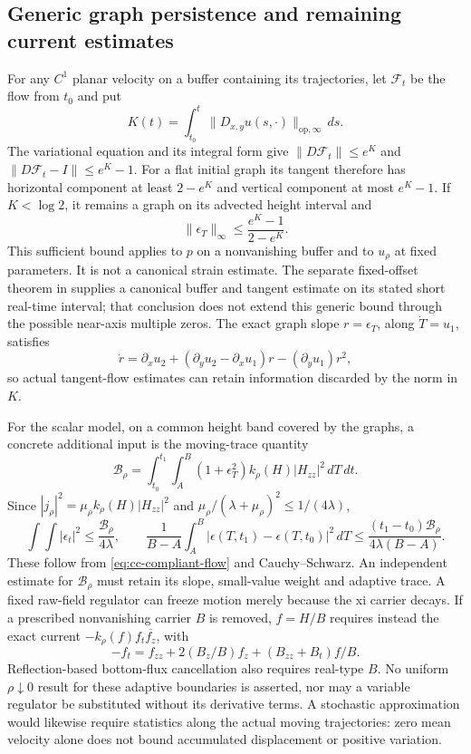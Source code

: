 \subsection{Generic graph persistence and remaining current estimates}

For any $C^1$ planar velocity on a buffer containing its trajectories,
let $\mathcal F_t$ be the flow from $t_0$ and put
\[
 K(t)=\int_{t_0}^t\|D_{x,y}u(s,\cdot)\|_{\mathrm{op},\infty}\,ds.
\]
The variational equation and its integral form give
$\|D\mathcal F_t\|\le e^K$ and
$\|D\mathcal F_t-I\|\le e^K-1$.
For a flat initial graph its tangent therefore has horizontal component
at least $2-e^K$ and vertical component at most $e^K-1$.  If
$K<\log2$, it remains a graph on its advected height interval and
\begin{equation}
 \|\epsilon_T\|_\infty\le\frac{e^K-1}{2-e^K}.
 \label{eq:cc-strain-bound}
\end{equation}
This sufficient bound applies to $p$ on a nonvanishing buffer and to
$u_\rho$ at fixed parameters.  It is not a canonical strain estimate.
The separate fixed-offset theorem in \cite{book-contours} supplies a
canonical buffer and tangent estimate on its stated short real-time
interval; that conclusion does not extend this generic bound through
the possible near-axis multiple zeros.
The exact graph slope $r=\epsilon_T$, along $\dot T=u_1$, satisfies
\[
 \dot r=\partial_xu_2+(\partial_yu_2-\partial_xu_1)r
                         -(\partial_yu_1)r^2,
\]
so actual tangent-flow estimates can retain information discarded by
the norm in $K$.

For the scalar model, on a common height band covered by the graphs,
a concrete additional input is the moving-trace quantity
\[
 \mathcal B_\rho=\int_{t_0}^{t_1}\int_A^B
 (1+\epsilon_T^2)k_\rho(H)|H_{zz}|^2\,dT\,dt.
\]
Since $|j_\rho|^2=\mu_\rho k_\rho(H)|H_{zz}|^2$ and
$\mu_\rho/(\lambda+\mu_\rho)^2\le1/(4\lambda)$,
\begin{equation}
 \int\!\int|\epsilon_t|^2\le\frac{\mathcal B_\rho}{4\lambda},
 \qquad
 \frac1{B-A}\int_A^B|\epsilon(T,t_1)-\epsilon(T,t_0)|^2\,dT
 \le\frac{(t_1-t_0)\mathcal B_\rho}{4\lambda(B-A)}.
 \label{eq:cc-trace-bound}
\end{equation}
These follow from \eqref{eq:cc-compliant-flow} and Cauchy--Schwarz.
An independent estimate for $\mathcal B_\rho$ must retain its slope,
small-value weight and adaptive trace.  A fixed raw-field regulator can
freeze motion merely because the xi carrier decays.  If a prescribed
nonvanishing carrier $B$ is removed, $f=H/B$ requires instead the exact
current $-k_\rho(f)f_t\overline{f_z}$, with
\[
 -f_t=f_{zz}+2(B_z/B)f_z+(B_{zz}+B_t)f/B.
\]
Reflection-based bottom-flux cancellation also requires real-type $B$.
No uniform $\rho\downarrow0$ result for these adaptive boundaries is
asserted, nor may a variable regulator be substituted without its
derivative terms.  A stochastic approximation would likewise require
statistics along the actual moving trajectories: zero mean velocity
alone does not bound accumulated displacement or positive variation.


